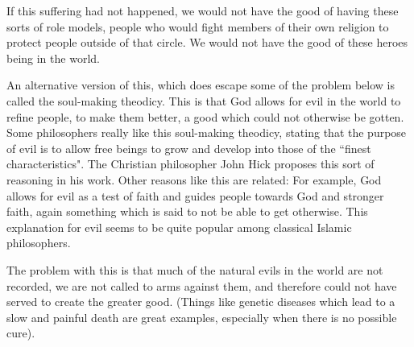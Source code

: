 
If this suffering had not happened, we would not have the good of having these sorts of role models, people who would fight members of their own religion to protect people outside of that circle. We would not have the good of these heroes being in the world.

An alternative version of this, which does escape some of the problem below is called the soul-making theodicy. This is that God allows for evil in the world to refine people, to make them better, a good which could not otherwise be gotten. Some philosophers really like this soul-making theodicy, stating that the purpose of evil is to allow free beings to grow and develop into those of the ``finest characteristics". The Christian philosopher John Hick proposes this sort of reasoning in his work.\autocite{Hick1} Other reasons like this are related: For example, God allows for evil as a test of faith and guides people towards God and stronger faith, again something which is said to not be able to get otherwise. This explanation for evil seems to be quite popular among classical Islamic philosophers.\autocite{Rouzati1}

The problem with this is that much of the natural evils in the world are not recorded, we are not called to arms against them, and therefore could not have served to create the greater good. (Things like genetic diseases which lead to a slow and painful death are great examples, especially when there is no possible cure).

